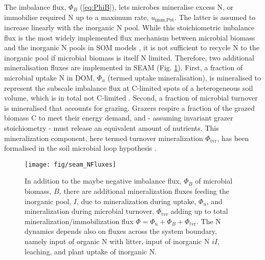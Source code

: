 The imbalance flux, $\Phi_B$ (\ref{eq:PhiB}), lets microbes mineralise excess N,
or immobilise required N up to a maximum rate, $u_{\operatorname{imm,Pot}}$. The
latter is assumed to increase linearly with the inorganic N pool.
While this stoichiometric imbalance flux is the most widely implemented flux
mechanism between microbial biomass and the inorganic N pools in SOM models
\citep{Manzoni09}, it is not sufficient to recycle N to the inorganic pool if
microbial biomass is itself N limited.
Therefore, two additional mineralisation fluxes are implemented in SEAM (Fig.
\ref{fig:SEAMStructNFluxes}). First, a fraction of microbial uptake N in DOM,
$\Phi_u$ (termed uptake mineralisation), is mineralised to represent the
subscale imbalance flux at C-limited spots of a heterogeneous soil volume, which
is in total not C-limited \citep{Manzoni08}.
Second, a fraction of microbial turnover is mineralised that accounts for
grazing. Grazers respire a fraction of the grazed biomass C to meet their energy
demand, and - assuming invariant grazer stoichiometry  - must release an
equivalent amount of nutrients.
This mineralization component, here termed turnover mineralization
$\Phi_{\operatorname{tvr}}$, has been formalised in the soil microbial loop
hypothesis \citep{Clarholm85, Raynaud06}.

\begin{figure}[t] \vspace*{2mm}
\begin{center}
\texttt{[image: fig/seam\_NFluxes]} 
\end{center}
\caption{
In addition to the maybe negative imbalance flux, $\Phi_B$ of microbial biomass,
$B$, there are additional mineralization fluxes feeding the inorganic pool, $I$,
due to mineralization during uptake, $\Phi_u$, and mineralization during
microbial turnover, $\Phi_{\operatorname{tvr}}$ adding up to total
mineralization/immobilization flux $\Phi = \Phi_u + \Phi_B +
\Phi_{\operatorname{tvr}}$.
The N dynamics depends also on fluxes across the system boundary, namely input of organic N with litter, input
of inorganic N $iI$, leaching, and plant uptake of inorganic N.
\label{fig:SEAMStructNFluxes}}
\end{figure}

